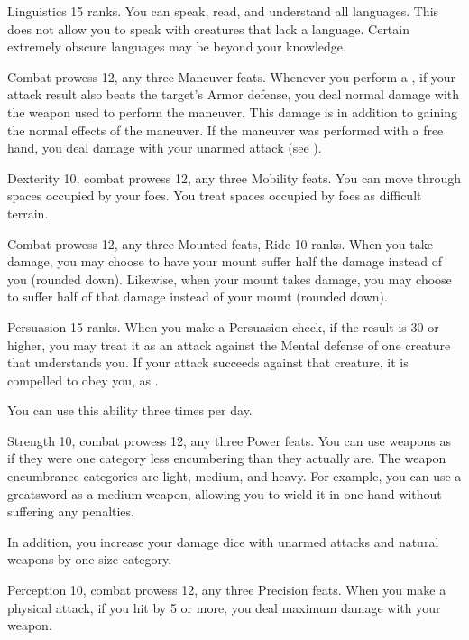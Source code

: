 \featpre Linguistics 15 ranks.
\featben You can speak, read, and understand all languages.
This does not allow you to speak with creatures that lack a language.
Certain extremely obscure languages may be beyond your knowledge.

\featpres Combat prowess 12, any three Maneuver feats.
\featben Whenever you perform a , if your attack result also beats the target's Armor defense, you deal normal damage with the weapon used to perform the maneuver.
This damage is in addition to gaining the normal effects of the maneuver.
If the maneuver was performed with a free hand, you deal damage with your unarmed attack (see ).

\featpres Dexterity 10, combat prowess 12, any three Mobility feats.
\featben You can move through spaces occupied by your foes.
You treat spaces occupied by foes as difficult terrain.

\featpres Combat prowess 12, any three Mounted feats, Ride 10 ranks.
\featben When you take damage, you may choose to have your mount suffer half the damage instead of you (rounded down).
Likewise, when your mount takes damage, you may choose to suffer half of that damage instead of your mount (rounded down).

\featpre Persuasion 15 ranks.
\featben When you make a Persuasion check, if the result is 30 or higher, you may treat it as an attack against the Mental defense of one creature that understands you.
If your attack succeeds against that creature, it is compelled to obey you, as .

You can use this ability three times per day.

\featpres Strength 10, combat prowess 12, any three Power feats.
\featben You can use weapons as if they were one category less encumbering than they actually are.
The weapon encumbrance categories are light, medium, and heavy.
For example, you can use a greatsword as a medium weapon, allowing you to wield it in one hand without suffering any penalties.

In addition, you increase your damage dice with unarmed attacks and natural weapons by one size category.

\featpres Perception 10, combat prowess 12, any three Precision feats.
\featben When you make a physical attack, if you hit by 5 or more, you deal maximum damage with your weapon.

